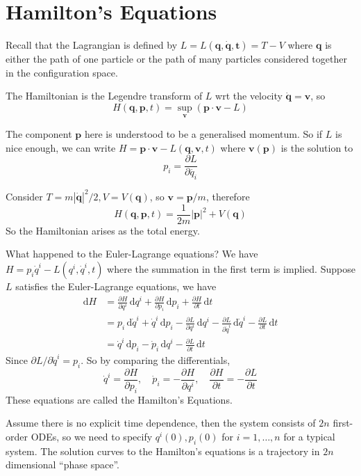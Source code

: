 \documentclass[a4paper]{article}
\begin{document}
\section{Hamilton's Equations}
Recall that the Lagrangian is defined by $L=L(\mathbf{q},\mathbf{\dot{q},t})=T-V$ where $\mathbf{q}$ is either the path of one particle or the path of many particles considered together in the configuration space.
\begin{definition}
    The Hamiltonian is the Legendre transform of $L$ wrt the velocity $\mathbf{\dot{q}}=\mathbf{v}$, so
    $$H(\mathbf{q},\mathbf{p},t)=\sup_{\mathbf{v}}(\mathbf{p}\cdot\mathbf{v}-L)$$
\end{definition}
The component $\mathbf{p}$ here is understood to be a generalised momentum.
So if $L$ is nice enough, we can write $H=\mathbf{p}\cdot\mathbf{v}-L(\mathbf{q},\mathbf{v},t)$ where $\mathbf{v}(\mathbf{p})$ is the solution to
$$p_i=\frac{\partial L}{\partial \dot{q_i}}$$
\begin{example}
    Consider $T=m|\mathbf{\dot{q}}|^2/2, V=V(\mathbf{q})$, so $\mathbf{v}=\mathbf{p}/m$, therefore
    $$H(\mathbf{q},\mathbf{p},t)=\frac{1}{2m}|\mathbf{p}|^2+V(\mathbf{q})$$
    So the Hamiltonian arises as the total energy.
\end{example}
What happened to the Euler-Lagrange equations?
We have $H=p_i\dot{q}^i-L(q^i,\dot{q}^i,t)$ where the summation in the first term is implied.
Suppose $L$ satisfies the Euler-Lagrange equations, we have
\begin{align*}
    \mathrm dH&=\frac{\partial H}{\partial q^i}\,\mathrm dq^i+\frac{\partial H}{\partial p_i}\,\mathrm dp_i+\frac{\partial H}{\partial t}\,\mathrm dt\\
    &=p_i\,\mathrm d\dot{q}^i+\dot{q}^i\,\mathrm dp_i-\frac{\partial L}{\partial q^i}\,\mathrm dq^i-\frac{\partial L}{\partial \dot{q}^i}\,\mathrm d\dot{q}^i-\frac{\partial L}{\partial t}\,\mathrm dt\\
    &=\dot{q}^i\,\mathrm dp_i-\dot{p}_i\,\mathrm dq^i-\frac{\partial L}{\partial t}\,\mathrm dt
\end{align*}
Since $\partial L/\partial \dot{q}^i=p_i$.
So by comparing the differentials,
$$\dot{q}^i=\frac{\partial H}{\partial p_i},\quad\dot{p}_i=-\frac{\partial H}{\partial q^i},\quad\frac{\partial H}{\partial t}=-\frac{\partial L}{\partial t}$$
These equations are called the Hamilton's Equations.

Assume there is no explicit time dependence, then the system consists of $2n$ first-order ODEs, so we need to specify $q^i(0),p_i(0)$ for $i=1,\ldots,n$ for a typical system.
The solution curves to the Hamilton's equations is a trajectory in $2n$ dimensional ``phase space''.
\end{document}
